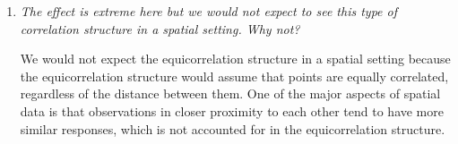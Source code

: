 \documentclass{article}\usepackage[]{graphicx}\usepackage[]{color}
\begin{document}
\begin{enumerate}
\begin{enumerate}
\begin{enumerate}
\item %

{\it The effect is extreme here but we would not expect to see this type of correlation structure in a spatial setting. Why not?}

We would not expect the equicorrelation structure in a spatial setting because the equicorrelation structure would assume that points are equally correlated, regardless of the distance between them. One of the major aspects of spatial data is that observations in closer proximity to each other tend to have more similar responses, which is not accounted for in the equicorrelation structure.

\end{enumerate}
\end{enumerate}

\end{enumerate}

\newpage
\end{document}
